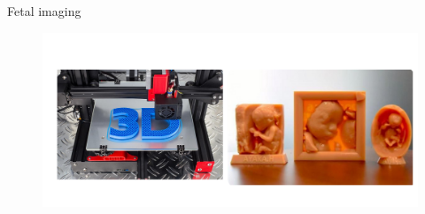 {
\begin{frame}{Fetal imaging}
      \begin{figure}
        \centering
        \includegraphics[width=1.0\textwidth]{./figures/3d-printing/versions/drawing-v00.png}
      \end{figure}
\end{frame}
}
